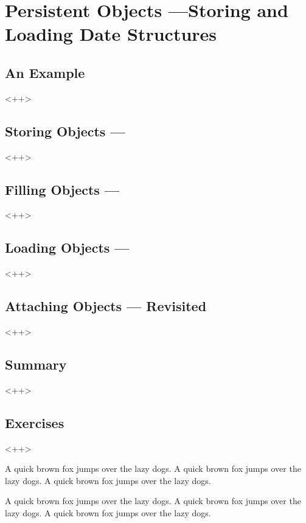 

\chapter{Persistent Objects ---Storing and Loading Date Structures}

\section{An Example}<++>

\section{Storing Objects ---}<++>

\section{Filling Objects ---}<++>

\section{Loading Objects ---}<++>

\section{Attaching Objects --- Revisited}<++>

\section{Summary}<++>

\section{Exercises}<++>

A quick brown fox jumps over the lazy dogs.
A quick brown fox jumps over the lazy dogs.
A quick brown fox jumps over the lazy dogs.

A quick brown fox jumps over the lazy dogs.
A quick brown fox jumps over the lazy dogs.
A quick brown fox jumps over the lazy dogs.


